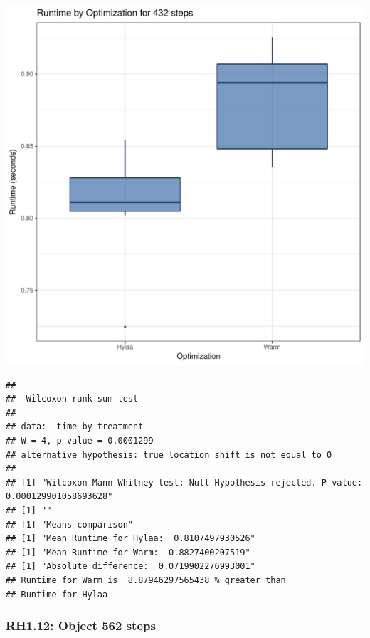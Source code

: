\documentclass{article}\usepackage[]{graphicx}\usepackage[]{color}
\makeatletter
\def\maxwidth{ %
  \ifdim\Gin@nat@width>\linewidth
    \linewidth
  \else
    \Gin@nat@width
  \fi
}
\newenvironment{kframe}{%
 \def\at@end@of@kframe{}%
 \ifinner\ifhmode%
  \def\at@end@of@kframe{\end{minipage}}%
  \begin{minipage}{\columnwidth}%
 \fi\fi%
 \def\FrameCommand##1{\hskip\@totalleftmargin \hskip-\fboxsep
 \colorbox{shadecolor}{##1}\hskip-\fboxsep
     \hskip-\linewidth \hskip-\@totalleftmargin \hskip\columnwidth}%
 \MakeFramed {\advance\hsize-\width
   \@totalleftmargin\z@ \linewidth\hsize
   \@setminipage}}%
 {\par\unskip\endMakeFramed%
 \at@end@of@kframe}
\newenvironment{knitrout}{}{} %
\makeatother
\begin{document}
\begin{knitrout}
\color{fgcolor}
\includegraphics[width=\maxwidth]{figure/RH1_steps432-1} 
\begin{kframe}\begin{verbatim}
## 
## 	Wilcoxon rank sum test
## 
## data:  time by treatment
## W = 4, p-value = 0.0001299
## alternative hypothesis: true location shift is not equal to 0
## 
## [1] "Wilcoxon-Mann-Whitney test: Null Hypothesis rejected. P-value: 0.000129901058693628"
## [1] ""
## [1] "Means comparison"
## [1] "Mean Runtime for Hylaa:  0.8107497930526"
## [1] "Mean Runtime for Warm:  0.8827400207519"
## [1] "Absolute difference:  0.0719902276993001"
## Runtime for Warm is  8.87946297565438 % greater than 
## Runtime for Hylaa
\end{verbatim}
\end{kframe}
\end{knitrout}


\subsubsection{RH1.12: Object 562 steps}
\end{document}
